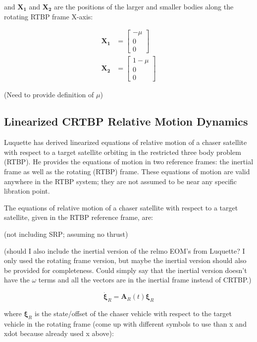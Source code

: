 \documentclass[a4paper]{article}
\begin{document}
and \(\mathbf{X_1}\) and \(\mathbf{X_2}\) are the positions of the larger and smaller bodies along the rotating RTBP frame X-axis:

\begin{equation*}
\begin{aligned}
\mathbf{X_1} &= \begin{bmatrix}
						-\mu \\ 0 \\ 0 
						\end{bmatrix} \\
\mathbf{X_2} &= \begin{bmatrix}
						1 - \mu \\ 0 \\ 0
						\end{bmatrix}
\end{aligned}
\end{equation*}

(Need to provide definition of \(\mu\))

\subsection{Linearized CRTBP Relative Motion Dynamics}
Luquette has derived linearized equations of relative motion of a chaser satellite with respect to a target satellite orbiting in the restricted three body problem (RTBP).  He provides the equations of motion in two reference frames: the inertial frame as well as the rotating (RTBP) frame.  These equations of motion are valid anywhere in the RTBP system; they are not assumed to be near any specific libration point.

The equations of relative motion of a chaser satellite with respect to a target satellite, given in the RTBP reference frame, are:

(not including SRP; assuming no thrust)

(should I also include the inertial version of the relmo EOM's from Luquette?  I only used the rotating frame version, but maybe the inertial version should also be provided for completeness.  Could simply say that the inertial version doesn't have the \(\omega\) terms and all the vectors are in the inertial frame instead of CRTBP.)

\begin{equation} \label{eq:RelmoDerivs}
\dot{\boldsymbol{\xi}}_R = \mathbf{A}_R(t)\boldsymbol{\xi}_R
\end{equation}

where \(\boldsymbol{\xi}_R\) is the state/offset of the chaser vehicle with respect to the target vehicle in the rotating frame (come up with different symbols to use than x and xdot because already used x above):
\end{document}
